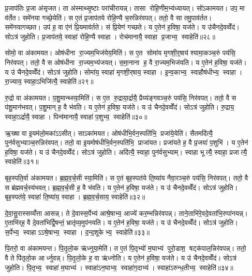 प्र॒जाप॑तिः प्र॒जा अ॑सृजत। ता अ॑स्माथ्सृ॒ष्टाः परा॑चीरायन्न्। तासा रोहि॒णीम॒भ्य॑ध्यायत्। सो॑ऽकामयत। उप॒ मा व॑र्तेत। समे॑नया गच्छे॒येति॑। स ए॒तं प्र॒जाप॑तये रोहि॒ण्यै च॒रुन्निर॑वपत्। ततो॒ वै सा तमु॒पाव॑र्तत। समे॑नयागच्छत। उप॑ ह॒ वा ए॑नं प्रि॒यमाव॑र्तते। सं प्रि॒येण॑ गच्छते। य ए॒तेन॑ ह॒विषा॒ यज॑ते। य उ॑चैनदे॒वव्वेँद॑। सोऽत्र॑ जुहोति। प्र॒जाप॑तये॒ स्वाहा॑ रोहि॒ण्यै स्वाहा। रोच॑मानायै॒ स्वाहा प्र॒जाभ्य॒ स्वाहेति॑॥२८॥

सोमो॒ वा अ॑कामयत। ओष॑धीना रा॒ज्यम॒भिज॑येय॒मिति॑। स ए॒त सोमा॑य मृगशी॒र्॒षाय॑ श्यामा॒कञ्च॒रुं पय॑सि॒ निर॑वपत्। ततो॒ वै स ओष॑धीना रा॒ज्यम॒भ्य॑जयत्। स॒मा॒नाना ह॒ वै रा॒ज्यम॒भिज॑यति। य ए॒तेन॑ ह॒विषा॒ यज॑ते। य उ॑ चैनदे॒वव्वेँद॑। सोऽत्र॑ जुहोति। सोमा॑य॒ स्वाहा॑ मृगशी॒र्‌षाय॒ स्वाहा। इ॒न्व॒काभ्य॒ स्वाहौष॑धीभ्य॒ स्वाहा। रा॒ज्याय॒ स्वाहा॒ऽभिजि॑त्यै॒ स्वाहेति॑॥२९॥

रु॒द्रो वा अ॑कामयत। प॒शु॒मान्थ्स्या॒मिति॑। स ए॒त रु॒द्राया॒र्द्रायै॒ प्रैय्य॑ङ्गवञ्च॒रुं पय॑सि॒ निर॑वपत्। ततो॒ वै स प॑शु॒मान॑भवत्। प॒शु॒मान् ह॒ वै भ॑वति। य ए॒तेन॑ ह॒विषा॒ यज॑ते। य उ॑ चैनदे॒वव्वेँद॑। सोऽत्र॑ जुहोति। रु॒द्राय॒ स्वाहा॒ऽर्द्रायै॒ स्वाहा। पिन्व॑मानायै॒ स्वाहा॑ प॒शुभ्य॒ स्वाहेति॑॥३०॥

ऋ॒ख्षा वा इ॒यम॑लो॒मका॑ऽऽसीत्। साऽका॑मयत। ओष॑धीभि॒र्वन॒स्पति॑भि॒ प्रजा॑ये॒येति॑। सैतमदि॑त्यै॒ पुन॑र्वसुभ्याञ्च॒रुन्निर॑वपत्। ततो॒ वा इ॒यमोष॑धीभि॒र्वन॒स्पति॑भि॒ प्राजा॑यत। प्रजा॑यते ह॒ वै प्र॒जया॑ प॒शुभि॑। य ए॒तेन॑ ह॒विषा॒ यज॑ते। य उ॑ चैनदे॒वव्वेँद॑। सोऽत्र॑ जुहोति। अदि॑त्यै॒ स्वाहा॒ पुन॑र्वसुभ्याम्। स्वाहा भूत्यै॒ स्वाहा॒ प्रजात्यै॒ स्वाहेति॑॥३१॥

बृह॒स्पति॒र्वा अ॑कामयत। ब्र॒ह्म॒व॒र्च॒सी स्या॒मिति॑। स ए॒तं बृह॒स्पत॑ये ति॒ष्या॑य नैवा॒रञ्च॒रुं पय॑सि॒ निर॑वपत्। ततो॒ वै स ब्र॑ह्मवर्च॒स्य॑भवत्। ब्र॒ह्म॒व॒र्च॒सी ह॒ वै भ॑वति। य ए॒तेन॑ ह॒विषा॒ यज॑ते। य उ॑ चैनदे॒वव्वेँद॑। सोऽत्र॑ जुहोति। बृह॒स्पत॑ये॒ स्वाहा॑ ति॒ष्या॑य॒ स्वाहा। ब्र॒ह्म॒व॒र्च॒साय॒ स्वाहेति॑॥३२॥

दे॒वा॒सु॒रास्सय्यँ॑त्ता आसन्न्। ते दे॒वास्स॒र्पेभ्य॑ आश्रे॒षाभ्य॒ आज्ये॑ कर॒म्भन्निर॑वपन्न्। ताने॒ताभि॑रे॒वदे॒वता॑भि॒रुपा॑नयन्न्। ए॒ताभि॑र्‌ह॒ वै दे॒वता॑भिर्द्वि॒षन्तं॒ भ्रातृ॑व्य॒मुप॑नयति। य ए॒तेन॑ ह॒विषा॒ यज॑ते। य उ॑ चैनदे॒वव्वेँद॑। सोऽत्र॑ जुहोति। स॒र्पेभ्य॒ स्वाहाऽऽश्रे॒षाभ्य॒ स्वाहा। द॒न्द॒शूकेभ्य॒ स्वाहेति॑॥३३॥

पि॒तरो॒ वा अ॑कामयन्त। पि॒तृ॒लो॒क ऋ॑ध्नुया॒मेति॑। त ए॒तं पि॒तृभ्यो॑ म॒घाभ्य॑ पुरो॒डाश॒ षट्क॑पाल॒न्निर॑वपन्न्। ततो॒ वै ते पि॑तृलो॒क आर्ध्नुवन्न्। पि॒तृ॒लो॒के ह॒ वा ऋ॑ध्नोति। य ए॒तेन॑ ह॒विषा॒ यज॑ते। य उ॑ चैनदे॒वव्वेँद॑। सोऽत्र॑ जुहोति। पि॒तृभ्य॒ स्वाहा॑ म॒घाभ्य॑। स्वाहा॑ऽन॒घाभ्य॒ स्वाहा॑ग॒दाभ्य॑। स्वाहा॑ऽरुन्ध॒तीभ्य॒ स्वाहेति॑॥३४॥

